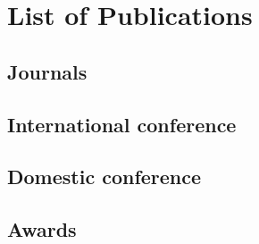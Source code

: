 \documentclass[a4paper,11pt,oneside,openany,fleqn]{jsbook}
\begin{document}
    \chapter*{List of Publications}

        \section*{Journals}

        \section*{International conference}

        \section*{Domestic conference}

        \section*{Awards}
\end{document}
